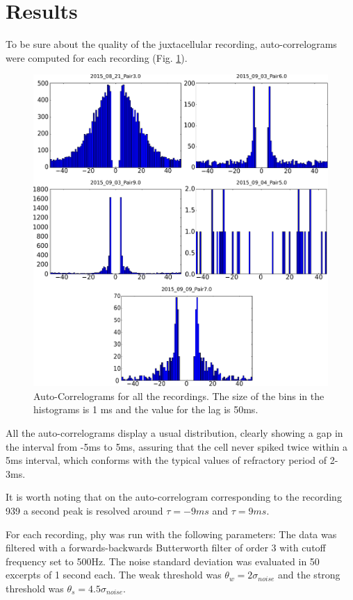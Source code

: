 \documentclass{article}
\begin{document}
\section{Results}
To be sure about the quality of the juxtacellular recording, auto-correlograms were computed for each recording (Fig. \ref{fig:AC}).
\begin{figure}[!h]
	\centering
	\includegraphics[width=\linewidth]{AC.pdf}
	\caption{Auto-Correlograms for all the recordings. The size of the bins in the histograms is 1 ms and the value for the lag is 50ms.
}
\label{fig:AC}
\end{figure}

All the auto-correlograms display a usual distribution, clearly showing a gap in the interval from -5ms to 5ms, assuring that the cell never spiked twice  within a 5ms interval, which conforms with the typical values of refractory period of 2-3ms.

It is worth noting that on the auto-correlogram corresponding to the recording 939 a second peak is resolved around $\tau = -9 ms$ and $\tau = 9 ms$.

For each recording, phy was run with the following parameters:
The data was filtered with a forwards-backwards Butterworth filter of order 3 with cutoff frequency set to 500Hz. The noise standard deviation was evaluated in 50 excerpts of 1 second each. The weak threshold was $\theta_w = 2 \sigma_{noise}$ and the strong threshold was $\theta_s = 4.5 \sigma_{noise}$.
\end{document}
